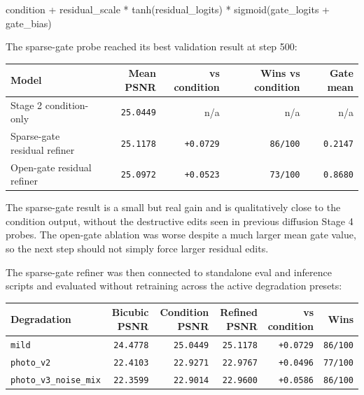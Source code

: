\documentclass[
  10pt,
]{article}
\newenvironment{Shaded}{}{}
\newcommand{\NormalTok}[1]{#1}
\begin{document}
\begin{Shaded}
\begin{Highlighting}[]
\NormalTok{condition + residual\_scale * tanh(residual\_logits) * sigmoid(gate\_logits + gate\_bias)}
\end{Highlighting}
\end{Shaded}

The sparse-gate probe reached its best validation result at step 500:

\begin{longtable}[]{@{}lrrrr@{}}
\toprule\noalign{}
Model & Mean PSNR & vs condition & Wins vs condition & Gate mean \\
\midrule\noalign{}
\endhead
\bottomrule\noalign{}
\endlastfoot
Stage 2 condition-only & \texttt{25.0449} & n/a & n/a & n/a \\
Sparse-gate residual refiner & \texttt{25.1178} & \texttt{+0.0729} &
\texttt{86/100} & \texttt{0.2147} \\
Open-gate residual refiner & \texttt{25.0972} & \texttt{+0.0523} &
\texttt{73/100} & \texttt{0.8680} \\
\end{longtable}

The sparse-gate result is a small but real gain and is qualitatively
close to the condition output, without the destructive edits seen in
previous diffusion Stage 4 probes. The open-gate ablation was worse
despite a much larger mean gate value, so the next step should not
simply force larger residual edits.

The sparse-gate refiner was then connected to standalone eval and
inference scripts and evaluated without retraining across the active
degradation presets:

\begin{longtable}[]{@{}lrrrrr@{}}
\toprule\noalign{}
Degradation & Bicubic PSNR & Condition PSNR & Refined PSNR & vs
condition & Wins \\
\midrule\noalign{}
\endhead
\bottomrule\noalign{}
\endlastfoot
\texttt{mild} & \texttt{24.4778} & \texttt{25.0449} & \texttt{25.1178} &
\texttt{+0.0729} & \texttt{86/100} \\
\texttt{photo\_v2} & \texttt{22.4103} & \texttt{22.9271} &
\texttt{22.9767} & \texttt{+0.0496} & \texttt{77/100} \\
\texttt{photo\_v3\_noise\_mix} & \texttt{22.3599} & \texttt{22.9014} &
\texttt{22.9600} & \texttt{+0.0586} & \texttt{86/100} \\
\end{longtable}
\end{document}
